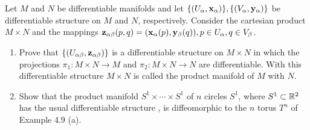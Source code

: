 \begin{Exercise}
    Let $M$ and $N$ be differentiable manifolds and let $\{(U_\alpha,\mathbf{x}_\alpha)\}, \{(V_\alpha,\mathbf{y}_\alpha)\}$ be differentiable structure on $M$ and $N$, respectively. Consider the cartesian product $M\times N$ and the mappings $\mathbf{z}_{\alpha\beta}(p,q)=(\mathbf{x}_\alpha (p),\mathbf{y}_\beta (q)), p\in U_\alpha, q\in V_\beta$.
    \begin{enumerate}[label=(\bf\alph*)]
        \item Prove that $\{(U_{\alpha\beta},\mathbf{z}_{\alpha\beta})\}$ is a differentiable structure on $M\times N$ in which the projections $\pi_1\colon M\times N \to M$  and $\pi_2\colon M\times N \to N$ are differentiable. With this differentiable structure $M\times N$ is called the product manifold of $M$ with $N$.
        \item Show that the product manifold $S^1\times \cdots\times S^1$ of $n$ circles $S^1$, where $S^1\subset {\mathbb R}^2$ has the usual differentiable structure , is diffeomorphic to the $n$ torus $T^n$ of \textsf{Example 4.9 (a)}.
    \end{enumerate}
\end{Exercise}
